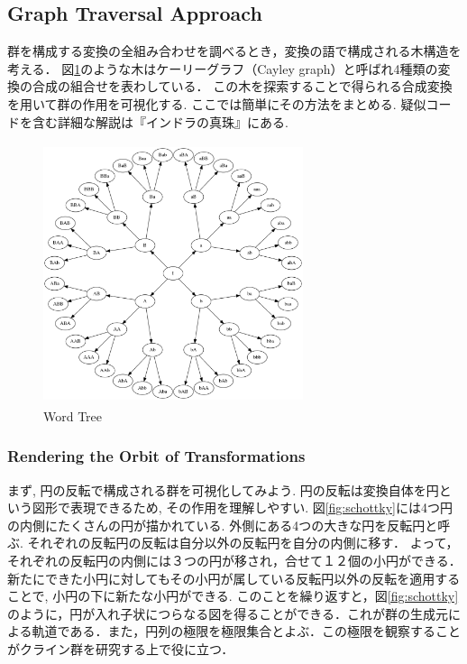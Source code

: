 \subsection{Graph Traversal Approach}

群を構成する変換の全組み合わせを調べるとき，変換の語で構成される木構造を考える．
図\ref{fig:wordTree}のような木はケーリーグラフ（Cayley graph）と呼ばれ4種類の変換の合成の組合せを表わしている．
この木を探索することで得られる合成変換を用いて群の作用を可視化する. ここでは簡単にその方法をまとめる.
疑似コードを含む詳細な解説は『インドラの真珠』にある.

\begin{figure}[htbp]
  \begin{center}
   \includegraphics[width=3in, height=3in, keepaspectratio]{../img/klein/wordTree.pdf}
   \caption{Word Tree}
   \label{fig:wordTree}
  \end{center}
\end{figure}

\subsubsection{Rendering the Orbit of Transformations}

まず, 円の反転で構成される群を可視化してみよう.
円の反転は変換自体を円という図形で表現できるため, その作用を理解しやすい.
図\ref{fig:schottky}には4つ円の内側にたくさんの円が描かれている.
外側にある4つの大きな円を反転円と呼ぶ.
それぞれの反転円の反転は自分以外の反転円を自分の内側に移す．
よって，それぞれの反転円の内側には３つの円が移され，合せて１２個の小円ができる．
新たにできた小円に対してもその小円が属している反転円以外の反転を適用することで, 小円の下に新たな小円ができる.
このことを繰り返すと，図\ref{fig:schottky}のように，円が入れ子状につらなる図を得ることができる．これが群の生成元による軌道である．また，円列の極限を極限集合とよぶ．この極限を観察することがクライン群を研究する上で役に立つ．

